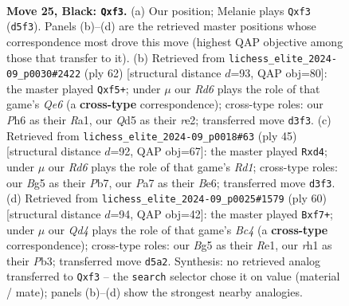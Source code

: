 \documentclass[11pt]{article}
\begin{document}
\clearpage

\begin{figure}[p]\centering
\begin{subfigure}{0.46\textwidth}\centering
\resizebox{\linewidth}{!}{%
\newchessgame
\chessboard[
  setfen={Q7/pp1n2kp/7p/1P1q2b1/3P2P1/3r1P2/4N3/R3KB1R b - - 2 25},
  showmover=false,
  pgfstyle=straightmove, color=movearrow, markmove={d5-f3}
]}
\caption{}
\end{subfigure}\hfill
\begin{subfigure}{0.46\textwidth}\centering
\resizebox{\linewidth}{!}{%
\newchessgame
\chessboard[
  setfen={1R1b1k1r/6p1/p3Q2p/4Pp2/3P3q/4P3/4r1PB/R6K w - - 6 32},
  showmover=false,
  pgfstyle=straightmove, color=movearrow, markmove={e6-f5}
]}
\caption{}
\end{subfigure}
\\[4pt]
\begin{subfigure}{0.46\textwidth}\centering
\resizebox{\linewidth}{!}{%
\newchessgame
\chessboard[
  setfen={3r2k1/pp3p2/4bqpQ/8/3N4/7P/PPB2PP1/4R1K1 b - - 0 23},
  showmover=false,
  pgfstyle=straightmove, color=movearrow, markmove={d8-d4}
]}
\caption{}
\end{subfigure}\hfill
\begin{subfigure}{0.46\textwidth}\centering
\resizebox{\linewidth}{!}{%
\newchessgame
\chessboard[
  setfen={3r2k1/p4pp1/1p1P3p/8/2BQ3P/1P3P1b/P4KPq/4R3 w - - 1 31},
  showmover=false,
  pgfstyle=straightmove, color=movearrow, markmove={c4-f7}
]}
\caption{}
\end{subfigure}
\caption{\textbf{Move 25, Black: \texttt{Qxf3}.} (a) Our position; Melanie plays \texttt{Qxf3} (\texttt{d5f3}). Panels (b)--(d) are the retrieved master positions whose correspondence most drove this move (highest QAP objective among those that transfer to it). (b) Retrieved from \texttt{lichess\_elite\_2024-09\_p0030\#2422} (ply 62) [structural distance $d$=93, QAP obj=80]: the master played \texttt{Qxf5+}; under $\mu$ our \emph{Rd6} plays the role of that game's \emph{Qe6} (a \textbf{cross-type} correspondence); cross-type roles: our \emph{P}h6 as their \emph{R}a1, our \emph{Q}d5 as their \emph{r}e2; transferred move \texttt{d3f3}. (c) Retrieved from \texttt{lichess\_elite\_2024-09\_p0018\#63} (ply 45) [structural distance $d$=92, QAP obj=67]: the master played \texttt{Rxd4}; under $\mu$ our \emph{Rd6} plays the role of that game's \emph{Rd1}; cross-type roles: our \emph{B}g5 as their \emph{P}b7, our \emph{P}a7 as their \emph{B}e6; transferred move \texttt{d3f3}. (d) Retrieved from \texttt{lichess\_elite\_2024-09\_p0025\#1579} (ply 60) [structural distance $d$=94, QAP obj=42]: the master played \texttt{Bxf7+}; under $\mu$ our \emph{Qd4} plays the role of that game's \emph{Bc4} (a \textbf{cross-type} correspondence); cross-type roles: our \emph{B}g5 as their \emph{R}e1, our \emph{r}h1 as their \emph{P}b3; transferred move \texttt{d5a2}. Synthesis: no retrieved analog transferred to \texttt{Qxf3} -- the \texttt{search} selector chose it on value (material / mate); panels (b)--(d) show the strongest nearby analogies.}
\label{fig:thought-m49}
\end{figure}
\end{document}
